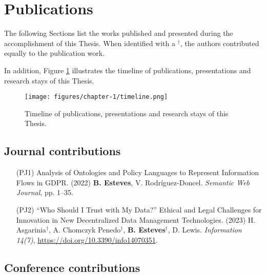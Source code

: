 \section{Publications}
\label{sec:publications}

The following Sections list the works published and presented during the accomplishment of this Thesis. When identified with a $^{\dagger}$, the authors contributed equally to the publication work.

In addition, Figure \ref{fig:timeline} illustrates the timeline of publications, presentations and research stays of this Thesis.

\begin{figure}
    \centering
    \texttt{[image: figures/chapter-1/timeline.png]}
    \caption{Timeline of publications, presentations and research stays of this Thesis.}
    \label{fig:timeline}
\end{figure}

\subsection{Journal contributions}
\label{sec:publications_journal}

\begin{enumerate}
    \item [(PJ1)] Analysis of Ontologies and Policy Languages to Represent Information Flows in GDPR. (2022) \textbf{B. Esteves}, V. Rodríguez-Doncel. \textit{Semantic Web Journal}, pp. 1--35. 
    \item [(PJ2)] ``Who Should I Trust with My Data?'' Ethical and Legal Challenges for Innovation in New Decentralized Data Management Technologies. (2023) H. Asgarinia$^{\dagger}$, A. Chomczyk Penedo$^{\dagger}$, \textbf{B. Esteves}$^{\dagger}$, D. Lewis. \textit{Information 14(7)}, \url{https://doi.org/10.3390/info14070351}.
\end{enumerate}

\subsection{Conference contributions}
\label{sec:publications_conference}

